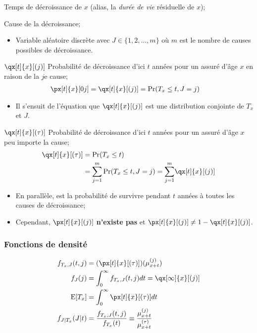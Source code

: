 \documentclass[10pt, french]{article}
\begin{document}
\begin{multicols*}{2}
\begin{description}
	\item[$T_{x}$]	Temps de décroissance de $x$ (alias, la \textit{durée de vie} résiduelle de $x$);
	\item[$J$]	Cause de la décroissance;
		\begin{itemize}[leftmargin = *]
		\item	Variable aléatoire discrète avec $J \in \{1, 2, \dots, m\}$ où $m$ est le nombre de causes possibles de décroissance.
		\end{itemize}
	\item	$\qx[t]{x}[(j)]$	Probabilité de décroissance d'ici $t$ années pour un assuré d'âge $x$ en raison de la $j$e cause;
		\begin{align*}
		\px[t]{x}[0j]
		&=	\qx[t]{x}[(j)]
		=	\Pr(T_{x} \leq t, J = j)
		\end{align*}
		\begin{itemize}[leftmargin = *]
		\item	Il s'ensuit de l'équation que $\qx[t]{x}[(j)]$ est une distribution conjointe de $T_{x}$ et $J$.
		\end{itemize}
	\item	$\qx[t]{x}[(\tau)]$	Probabilité de décroissance d'ici $t$ années pour un assuré d'âge $x$ peu importe la cause;
		\begin{align*}
		\qx[t]{x}[(\tau)]
		&=	\Pr(T_{x} \leq t)		\\
		&=	\sumz{m}{j = 1} \Pr(T_{x} \leq t, J = j)	
		=	\sumz{m}{j = 1} \qx[t]{x}[(j)]	
		\end{align*}
		\begin{itemize}[leftmargin = *]
		\item	En parallèle,  est la probabilité de survivre pendant $t$ années à toutes les causes de décroissance;
		\item	Cependant, $\px[t]{x}[(j)]$ \textbf{n'existe pas} et $\px[t]{x}[(j)] \neq 1 - \qx[t]{x}[(j)]$.
		\end{itemize}
\end{description}

\subsubsection*{Fonctions de densité}
\begin{align*}
	f_{T_{x}, J}(t, j)
	&=	(\px[t]{x}[(\tau)])(\mu_{x + t}^{(j)})	\\
	f_{J}(j)
	&=	\int_{0}^{\infty} f_{T_{x}, J}(t, j) dt	
	=	\qx[\infty]{x}[(j)]	\\
	\text{E}[T_{x}]
	&=	\int_{0}^{\infty} \px[t]{x}[(\tau)]dt	\\
	f_{J | T_{x}}(J | t)
	&=	\frac{f_{T_{x}, J}(t, j)}{f_{T_{x}}(t)}
	\equiv	\frac{\mu_{x +  t}^{(j)}}{\mu_{x +  t}^{(\tau)}}
\end{align*}


\end{multicols*}
\end{document}
